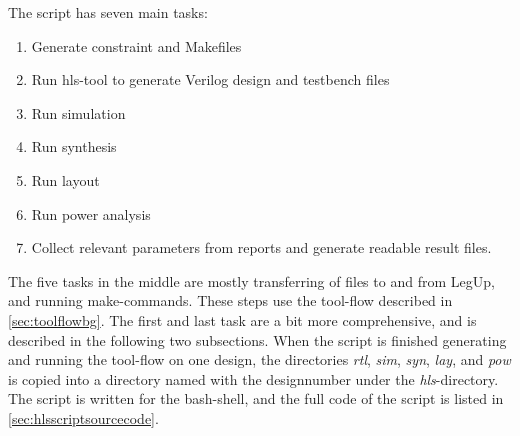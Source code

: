 The script has seven main tasks:
\begin{enumerate}
    \item Generate constraint and Makefiles
    \item Run \gls{hls}-tool to generate Verilog design and testbench files
    \item Run simulation
    \item Run synthesis
    \item Run layout
    \item Run power analysis
    \item Collect relevant parameters from reports and generate readable result files.
\end{enumerate}
The five tasks in the middle are mostly transferring of files to and from LegUp, and running make-commands. These steps use the tool-flow described in \cref{sec:toolflowbg}. The first and last task are a bit more comprehensive, and is described in the following two subsections. When the script is finished generating and running the tool-flow on one design, the directories \textit{rtl}, \textit{sim}, \textit{syn}, \textit{lay}, and \textit{pow} is copied into a directory named with the designnumber under the \textit{hls}-directory. The script is written for the bash-shell, and the full code of the script is listed in \cref{sec:hlsscriptsourcecode}.


